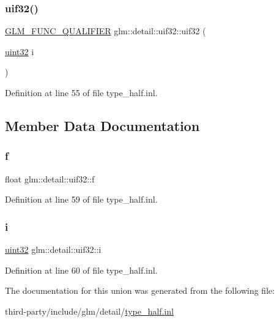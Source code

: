 \subsubsection{\texorpdfstring{uif32()}{uif32()}\hspace{0.1cm}{\footnotesize\ttfamily [3/3]}}
{\footnotesize\ttfamily \hyperlink{setup_8hpp_a33fdea6f91c5f834105f7415e2a64407}{G\+L\+M\+\_\+\+F\+U\+N\+C\+\_\+\+Q\+U\+A\+L\+I\+F\+I\+ER} glm\+::detail\+::uif32\+::uif32 (\begin{DoxyParamCaption}\item[{\hyperlink{namespaceglm_1_1detail_ade6cfbf377022aaa391af8cd50489222}{uint32}}]{i }\end{DoxyParamCaption})\hspace{0.3cm}{\ttfamily [inline]}}



Definition at line 55 of file type\+\_\+half.\+inl.



\subsection{Member Data Documentation}
\mbox{\label{unionglm_1_1detail_1_1uif32_a5f697f84c5a8ec72c2f3a4f705f5bde8}} 
\subsubsection{\texorpdfstring{f}{f}}
{\footnotesize\ttfamily float glm\+::detail\+::uif32\+::f}



Definition at line 59 of file type\+\_\+half.\+inl.

\mbox{\label{unionglm_1_1detail_1_1uif32_a981c1c59e160db23c73908cd7e629229}} 
\subsubsection{\texorpdfstring{i}{i}}
{\footnotesize\ttfamily \hyperlink{namespaceglm_1_1detail_ade6cfbf377022aaa391af8cd50489222}{uint32} glm\+::detail\+::uif32\+::i}



Definition at line 60 of file type\+\_\+half.\+inl.



The documentation for this union was generated from the following file\+:\begin{DoxyCompactItemize}
\item 
third-\/party/include/glm/detail/\hyperlink{type__half_8inl}{type\+\_\+half.\+inl}\end{DoxyCompactItemize}
